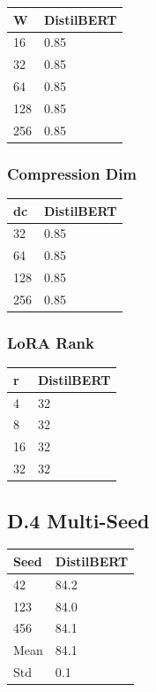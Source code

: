 \begin{table}[H]
\centering
\small
\begin{tabular}{ll}
\toprule
\textbf{W} & \textbf{DistilBERT} \\
\midrule
16 & 0.85 \\
32 & 0.85 \\
64 & 0.85 \\
128 & 0.85 \\
256 & 0.85 \\
\bottomrule
\end{tabular}
\end{table}

\subsubsection{Compression Dim}

\begin{table}[H]
\centering
\small
\begin{tabular}{ll}
\toprule
\textbf{dc} & \textbf{DistilBERT} \\
\midrule
32 & 0.85 \\
64 & 0.85 \\
128 & 0.85 \\
256 & 0.85 \\
\bottomrule
\end{tabular}
\end{table}

\subsubsection{LoRA Rank}

\begin{table}[H]
\centering
\small
\begin{tabular}{ll}
\toprule
\textbf{r} & \textbf{DistilBERT} \\
\midrule
4 & 32 \\
8 & 32 \\
16 & 32 \\
32 & 32 \\
\bottomrule
\end{tabular}
\end{table}

\subsection{D.4 Multi-Seed}

\begin{table}[H]
\centering
\small
\begin{tabular}{ll}
\toprule
\textbf{Seed} & \textbf{DistilBERT} \\
\midrule
42 & 84.2 \\
123 & 84.0 \\
456 & 84.1 \\
Mean & 84.1 \\
Std & 0.1 \\
\bottomrule
\end{tabular}
\end{table}

